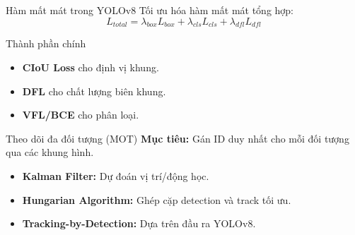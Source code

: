 \begin{frame}{Hàm mất mát trong YOLOv8}
    Tối ưu hóa hàm mất mát tổng hợp:
    $$ L_{total} = \lambda_{box} L_{box} + \lambda_{cls} L_{cls} + \lambda_{dfl} L_{dfl} $$
    \begin{block}{Thành phần chính}
    \begin{itemize}
        \item \textbf{CIoU Loss} cho định vị khung.
        \item \textbf{DFL} cho chất lượng biên khung.
        \item \textbf{VFL/BCE} cho phân loại.
    \end{itemize}
    \end{block}
\end{frame}

\begin{frame}{Theo dõi đa đối tượng (MOT)}
    \textbf{Mục tiêu:} Gán ID duy nhất cho mỗi đối tượng qua các khung hình.
    \begin{itemize}
        \item \textbf{Kalman Filter:} Dự đoán vị trí/động học.
        \item \textbf{Hungarian Algorithm:} Ghép cặp detection và track tối ưu.
        \item \textbf{Tracking-by-Detection:} Dựa trên đầu ra YOLOv8.
    \end{itemize}
\end{frame}

